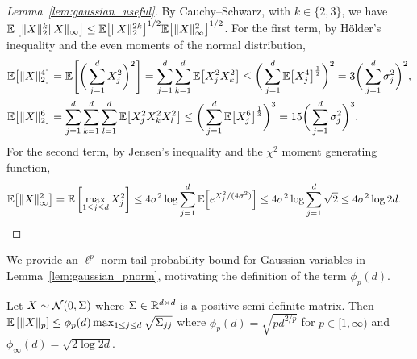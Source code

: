 \begin{proof}[Lemma~\ref{lem:gaussian_useful}]

  By Cauchy--Schwarz, with $k \in \{2,3\}$, we have
  $\mathbb{E}\left[\|X\|_2^{k} \|X\|_\infty \right]
  \leq \mathbb{E}\big[\|X\|_2^{2k} \big]^{1/2} \mathbb{E}\big[\|X\|_\infty^2 \big]^{1/2}$.
  For the first term, by H{\"o}lder's inequality and the even
  moments of the normal distribution,
  \begin{align*}
    \mathbb{E}\big[\|X\|_2^4 \big]
    &=
    \mathbb{E}\Bigg[
      \bigg(
        \sum_{j=1}^d X_j^2
      \bigg)^2
    \Bigg]
    =
    \sum_{j=1}^d \sum_{k=1}^d
    \mathbb{E}\big[
      X_j^2 X_k^2
    \big]
    \leq
    \bigg(
      \sum_{j=1}^d
      \mathbb{E}\big[X_j^4 \big]^{\frac{1}{2}}
    \bigg)^2
    =
    3 \bigg(
      \sum_{j=1}^d
      \sigma_j^2
    \bigg)^2, \\
    \mathbb{E}\big[\|X\|_2^6 \big]
    &=
    \sum_{j=1}^d \sum_{k=1}^d \sum_{l=1}^d
    \mathbb{E}\big[
      X_j^2 X_k^2 X_l^2
    \big]
    \leq
    \bigg(
      \sum_{j=1}^d
      \mathbb{E}\big[X_j^6 \big]^{\frac{1}{3}}
    \bigg)^3
    =
    15 \bigg(
      \sum_{j=1}^d
      \sigma_j^2
    \bigg)^3.
  \end{align*}
  For the second term, by Jensen's inequality and the $\chi^2$ moment
  generating function,
  \begin{align*}
    \mathbb{E}\big[\|X\|_\infty^2 \big]
    &=
    \mathbb{E}\left[
      \max_{1 \leq j \leq d}
      X_j^2
    \right]
    \leq
    4 \sigma^2
    \log
    \sum_{j=1}^d
    \mathbb{E}\Big[
      e^{X_j^2 / (4\sigma^2)}
    \Big]
    \leq
    4 \sigma^2
    \log
    \sum_{j=1}^d
    \sqrt{2}
    \leq
    4 \sigma^2
    \log 2 d.
  \end{align*}
\end{proof}

We provide an $\ell^p$-norm tail probability bound for Gaussian variables in
Lemma~\ref{lem:gaussian_pnorm}, motivating the definition of the term
$\phi_p(d)$.

\begin{lemma}%
  \label{lem:gaussian_pnorm}
  Let $X \sim \mathcal{N}(0, \Sigma)$ where $\Sigma \in \mathbb{R}^{d \times d}$
  is a positive semi-definite matrix. Then
  $\mathbb{E}\left[ \|X\|_p \right]
  \leq
  \phi_p(d)
  \max_{1 \leq j \leq d}
  \sqrt{\Sigma_{j j}}$
  where $\phi_p(d) = \sqrt{pd^{2/p} }$ for $p \in [1,\infty)$
  and $\phi_\infty(d) = \sqrt{2\log 2d}$.
\end{lemma}

